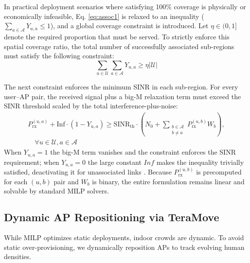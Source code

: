 \documentclass[conference]{IEEEtran}
\begin{document}
	In practical deployment scenarios where satisfying 100\% coverage is physically or economically infeasible, Eq. \eqref{eq:assoc1} is relaxed to an inequality ($\sum_{a \in \mathcal{A}} Y_{u,a} \le 1$), and a global coverage constraint is introduced. Let $\eta \in (0,1]$ denote the required proportion that must be served. To strictly enforce this spatial coverage ratio, the total number of successfully associated sub-regions must satisfy the following constraint:
	\begin{equation}
		\sum_{u \in \mathcal{U}} \sum_{a \in \mathcal{A}} Y_{u,a} \ge \eta |\mathcal{U}|
		\label{eq:coverage_constraint}
	\end{equation}

	The next constraint enforces the minimum SINR in each sub-region. For every user--AP pair, the received signal plus a big-M relaxation term must exceed the SINR threshold scaled by the total interference-plus-noise:
	\begin{equation}
		\begin{split}
			P_{\text{rx}}^{(u,a)} + \text{Inf} \cdot (1 - Y_{u,a}) \ge \text{SINR}_{\text{th}} \cdot \left( N_0 + \sum_{\substack{b \in \mathcal{A} \\ b \ne a}} P_{\text{rx}}^{(u,b)} W_b \right), \\
			\quad \forall u \in \mathcal{U}, a \in \mathcal{A}
		\end{split}
		\label{eq:sinr}
	\end{equation}
	When $Y_{u,a}=1$ the big-M term vanishes and the constraint enforces the SINR requirement; when $Y_{u,a}=0$ the large constant $\textit{Inf}$ makes the inequality trivially satisfied, deactivating it for unassociated links \cite{b4}. Because $P_{\text{rx}}^{(u,b)}$ is precomputed for each $(u,b)$ pair and $W_b$ is binary, the entire formulation remains linear and solvable by standard MILP solvers.

	\subsection{Dynamic AP Repositioning via TeraMove}

	While MILP optimizes static deployments, indoor crowds are dynamic. To
	avoid static over-provisioning, we dynamically reposition APs to track
	evolving human densities.
\end{document}
